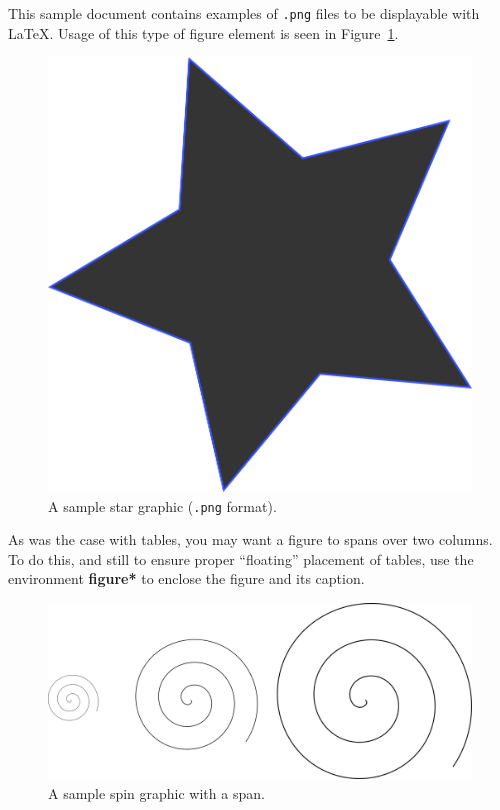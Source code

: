 \documentclass[article,english]{stucosrec}
\newcommand{\latex}{\LaTeX\xspace}
\begin{document}
	This sample document contains examples of \texttt{.png} files to be displayable with \latex.
	Usage of this type of figure element is seen in Figure~\ref{fig:star}.
	
	\begin{figure}
		\centering
		\includegraphics[scale=0.5]{star.png}
		\caption{A sample star graphic (\texttt{.png} format).}
		\label{fig:star}
	\end{figure}

	As was the case with tables, you may want a figure to spans over two columns.
	To do this, and still to ensure proper ``floating'' placement of tables, use the environment \textbf{figure*} to enclose the figure and its caption.
	
	\begin{figure}
		\centering
		\includegraphics[scale=0.8]{spin.png}
		\caption{A sample spin graphic with a span.}
		\label{fig:spin}
	\end{figure}
	
\end{document}
